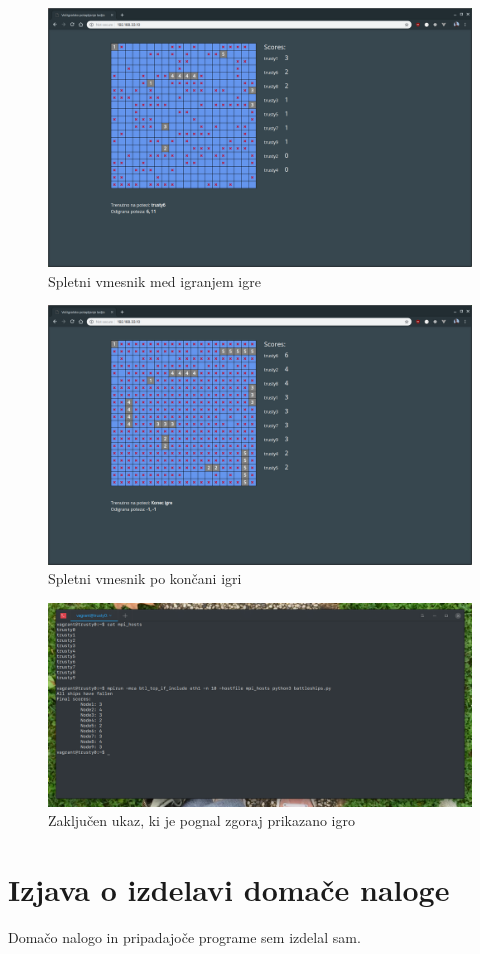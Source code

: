 \documentclass[a4paper,11pt]{article}
\begin{document}
\begin{figure}
\begin{center}
\includegraphics[scale=0.4]{./midgame.png}
\caption{Spletni vmesnik med igranjem igre}
\label{slika1}
\end{center}
\end{figure}

\begin{figure}
\begin{center}
\includegraphics[scale=0.4]{./endgame.png}
\caption{Spletni vmesnik po končani igri}
\label{slika2}
\end{center}
\end{figure}

\begin{figure}
\begin{center}
\includegraphics[scale=0.45]{./commands.png}
\caption{Zaključen ukaz, ki je pognal zgoraj prikazano igro}
\label{slika3}
\end{center}
\end{figure}

\section{Izjava o izdelavi domače naloge}
Domačo nalogo in pripadajoče programe sem izdelal sam.
\end{document}
